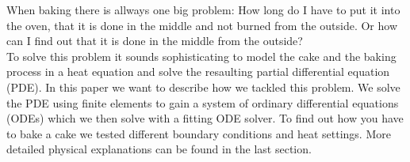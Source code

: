 
When baking there is allways one big problem: How long do I have to put it into the oven, that it is done in the middle and not burned from the outside. Or how can I find out that it is done in the middle from the outside? \\

To solve this problem it sounds sophisticating to model the cake and the baking process in a heat equation and solve the resaulting partial differential equation (PDE). In this paper we want to describe how we tackled this problem. We solve the PDE using finite elements to gain a system of ordinary differential equations (ODEs) which we then solve with a fitting ODE solver. To find out how you have to bake a cake we tested different boundary conditions and heat settings. More detailed physical explanations can be found in the last section.

% 
